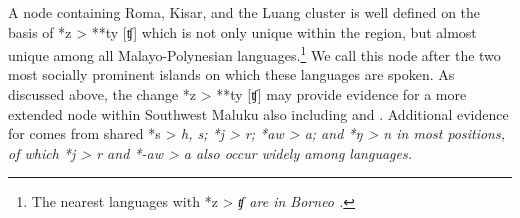 A node containing Roma,
Kisar, and the Luang cluster is well defined on the basis of
*z > **ty [ʧ] which is not only unique within the region,
but almost unique among all Malayo-Polynesian languages.\footnote{
		The nearest languages with *z > \it{ʧ} are in Borneo \citep[279]{Smith2017a}.}
We call this node  after the two most socially
prominent islands on which these languages are spoken.
As discussed above, the change *z > **ty [ʧ] may provide evidence
for a more extended node within Southwest Maluku also including  and .
Additional evidence for  comes from shared *s
> \it{h, s}; *j > \it{r}; *aw > \it{a};
and *ŋ > \it{n} in most positions,
of which *j > \it{r}
and *-aw > \it{a} also occur widely among  languages.

